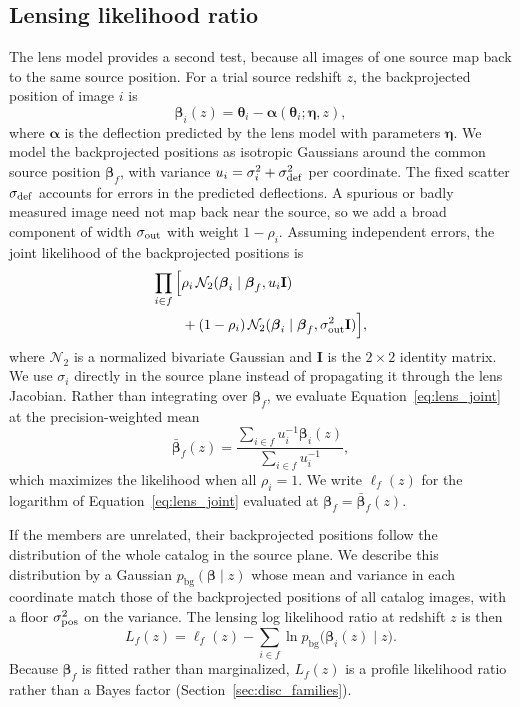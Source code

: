 \documentclass[twocolumn,twocolappendix,linenumbers]{aastex701}
\newcommand{\N}{\mathcal{N}}
\newcommand{\bg}{\mathrm{bg}}
\begin{document}
\subsection{Lensing likelihood ratio}
\label{sec:lensing}
The lens model provides a second test, because all images of one source map back to the same source position.
For a trial source redshift $z$, the backprojected position of image $i$ is
\begin{equation}
\boldsymbol\beta_i(z)=\boldsymbol\theta_i-\boldsymbol\alpha(\boldsymbol\theta_i;\boldsymbol\eta,z),
\label{eq:backproject}
\end{equation}
where $\boldsymbol\alpha$ is the deflection predicted by the lens model with parameters $\boldsymbol\eta$.
We model the backprojected positions as isotropic Gaussians around the common source position $\boldsymbol\beta_f$, with variance $u_i=\sigma_i^2+\sigma_{\rm def}^2$ per coordinate.
The fixed scatter $\sigma_{\rm def}$ accounts for errors in the predicted deflections.
A spurious or badly measured image need not map back near the source, so we add a broad component of width $\sigma_{\rm out}$ with weight $1-\rho_i$.
Assuming independent errors, the joint likelihood of the backprojected positions is
\begin{equation}
\begin{aligned}
\prod_{i\in f}\Big[&\rho_i\,\N_2(\boldsymbol\beta_i\mid\boldsymbol\beta_f,u_i\mathbf I)\\
&+(1-\rho_i)\,\N_2(\boldsymbol\beta_i\mid\boldsymbol\beta_f,\sigma_{\rm out}^2\mathbf I)\Big],
\end{aligned}
\label{eq:lens_joint}
\end{equation}
where $\N_2$ is a normalized bivariate Gaussian and $\mathbf I$ is the $2\times2$ identity matrix.
We use $\sigma_i$ directly in the source plane instead of propagating it through the lens Jacobian.
Rather than integrating over $\boldsymbol\beta_f$, we evaluate Equation~\ref{eq:lens_joint} at the precision-weighted mean
\begin{equation}
\bar{\boldsymbol\beta}_f(z)=\frac{\sum_{i\in f}u_i^{-1}\boldsymbol\beta_i(z)}{\sum_{i\in f}u_i^{-1}},
\label{eq:centroid}
\end{equation}
which maximizes the likelihood when all $\rho_i=1$.
We write $\ell_f(z)$ for the logarithm of Equation~\ref{eq:lens_joint} evaluated at $\boldsymbol\beta_f=\bar{\boldsymbol\beta}_f(z)$.

If the members are unrelated, their backprojected positions follow the distribution of the whole catalog in the source plane.
We describe this distribution by a Gaussian $p_{\bg}(\boldsymbol\beta\mid z)$ whose mean and variance in each coordinate match those of the backprojected positions of all catalog images, with a floor $\sigma_{\rm pos}^2$ on the variance.
The lensing log likelihood ratio at redshift $z$ is then
\begin{equation}
L_f(z)=\ell_f(z)-\sum_{i\in f}\ln p_{\bg}\big(\boldsymbol\beta_i(z)\mid z\big).
\label{eq:lens_ratio}
\end{equation}
Because $\boldsymbol\beta_f$ is fitted rather than marginalized, $L_f(z)$ is a profile likelihood ratio rather than a Bayes factor (Section~\ref{sec:disc_families}).
\end{document}
